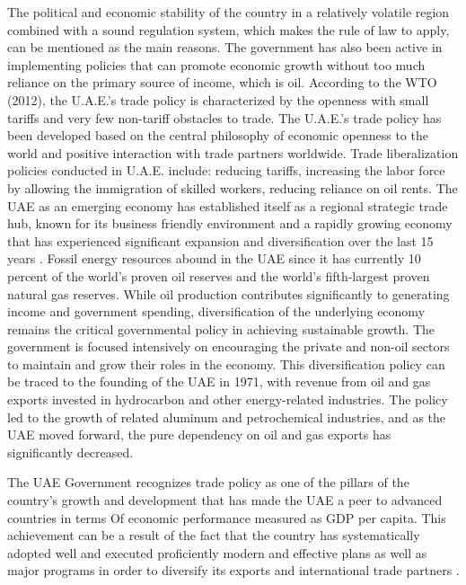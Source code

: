 \documentclass[12pt,a4 paper,title page]{article}
\begin{document}
\begin{flushleft} \justifying The political and economic stability of the country in a relatively volatile region combined with a sound regulation system, which makes the rule of law to apply, can be mentioned as the main reasons. The government has also been active in implementing policies that can promote economic growth without too much reliance on the primary source of income, which is oil. 
\hfill\break
 According to the \ac{WTO} (2012), the U.A.E.’s trade policy is characterized by the openness with small tariffs and very few non-tariff obstacles to trade.
The U.A.E.’s trade policy has been developed based on the central philosophy of economic openness to the world and positive interaction with trade partners worldwide.
Trade liberalization policies conducted in U.A.E. include: reducing tariffs, increasing the labor force by allowing the immigration of skilled workers, reducing reliance on oil rents. The UAE as an emerging economy has established itself as a regional strategic trade hub, known for its business friendly environment and a rapidly growing economy that has experienced significant expansion and diversification over the last 15 years \citep{al2016trade}.
Fossil energy resources abound in the UAE since it has currently 10 percent of the world’s proven oil reserves and the world’s fifth-largest proven natural gas reserves.
While oil production contributes significantly to generating income and government spending, diversification of the underlying economy remains the critical governmental policy in achieving sustainable growth. The government is focused intensively on encouraging the private and non-oil sectors to maintain and grow their roles in the
economy. This diversification policy can be traced to the founding of the UAE in 1971, with revenue from oil and gas exports invested in hydrocarbon and other energy-related industries. The policy led to the growth of related aluminum and petrochemical industries, and as the UAE moved forward, the pure dependency on oil and gas exports has significantly decreased.\end{flushleft}
\hfill\break
The UAE Government recognizes trade policy as one of the pillars of the country’s growth and development that has made the UAE a peer to advanced countries in terms Of economic performance measured as GDP per capita. This achievement can be a result of the fact that the country has systematically adopted well and executed proficiently modern and effective plans as well as major programs in order to diversify its exports and international trade partners \citep{al2016trade}.
\end{document}
